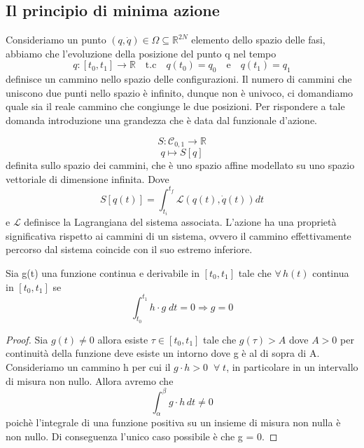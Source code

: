 \subsection{Il principio di minima azione}

Consideriamo un punto $(q,\dot q) \in \Omega \subseteq \mathbb{R}^{2N}$ elemento dello spazio delle fasi, abbiamo che l'evoluzione della posizione del punto q nel tempo
\begin{equation}
	q : [t_0,t_1] \rightarrow \mathbb{R} \quad \text{t.c} \quad  q(t_0) = q_0 \quad \text{e} \quad q(t_1) = q_1
\end{equation}
definisce un cammino nello spazio delle configurazioni. Il numero di cammini che uniscono due punti nello spazio \`{e} infinito, dunque non \`{e} univoco, ci domandiamo quale sia il reale cammino che congiunge le due posizioni. Per rispondere a tale domanda introduzione una grandezza che \`{e} data dal funzionale d'azione.

\begin{equation}
	S: \mathcal{C}_{0,1} \rightarrow \mathbb{R} 	
\end{equation}
\begin{equation*}
	q \mapsto S[q] 
\end{equation*}
definita sullo spazio dei cammini, che \`{e} uno spazio affine modellato su uno spazio vettoriale di dimensione infinita. Dove 
\begin{equation}
	S\left[q(t)\right]=\int_{t_i}^{t_f} \mathcal{L}\left(q(t), \dot{q}(t)\right) d t
\end{equation}
e $\mathcal{L}$ definisce la Lagrangiana del sistema associata. L'azione  ha una propriet\`{a} significativa rispetto ai cammini di un sistema, ovvero il cammino effettivamente percorso dal sistema coincide con il suo estremo inferiore. 
\begin{lemma}
	Sia g(t) una funzione continua e derivabile in $[t_0,t_1]$ tale che $\forall \,h(t)$ continua in $[t_0,t_1]$ se 
	\begin{equation*}
		\int_{t_0}^{t_1}h \cdot g \;dt = 0 \Rightarrow g = 0
	\end{equation*}
	\end{lemma}
	\begin{proof}
	Sia $g(t) \neq 0$ allora esiste $\tau \in [t_0,t_1]$ tale che $g(\tau) > A $ dove $A>0$ per continuit\`{a} della funzione deve esiste un intorno dove g \`{e} al di sopra di A. Consideriamo un cammino h per cui il $g\cdot h > 0 \;\; \forall \;t$, in particolare in un intervallo di misura non nullo. Allora avremo che 
	\begin{equation*}
		\int_{\alpha}^{\beta}g \cdot h \,dt \neq 0
	\end{equation*}
	poich\`{e} l'integrale di una funzione positiva su un insieme di misura non nulla \`{e} non nullo. Di conseguenza l'unico caso possibile \`{e} che g = 0.
	
	\end{proof}

